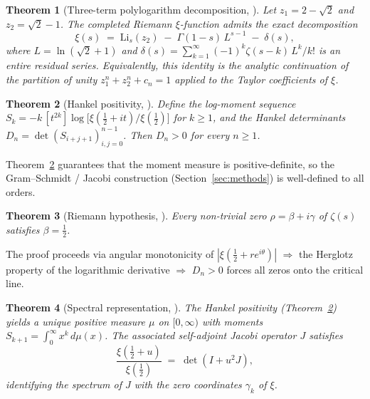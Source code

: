 \documentclass[aps,prx,reprint,floatfix]{revtex4-2}
\newtheorem{theorem}{Theorem}
\begin{document}
\begin{theorem}[Three-term polylogarithm decomposition, \cite{chen2026rh}]
\label{th:three-term}
Let $z_1=2-\sqrt{2}$ and $z_2=\sqrt{2}-1$. The completed Riemann
$\xi$-function admits the exact decomposition
\begin{equation}
\xi(s) \;=\; \mathrm{Li}_s(z_2)
\;-\; \Gamma(1-s)\,L^{s-1}
\;-\; \delta(s),
\label{eq:three-term-xi}
\end{equation}
where $L=\ln(\sqrt{2}+1)$ and $\delta(s)=\sum_{k=1}^{\infty}(-1)^k\zeta(s-k)\,L^k/k!$
is an entire residual series. Equivalently, this identity is the analytic
continuation of the partition of unity $z_1^n+z_2^n+c_n=1$ applied to the
Taylor coefficients of $\xi$.
\end{theorem}

\begin{theorem}[Hankel positivity, \cite{chen2026rh}]
\label{th:hankel}
Define the log-moment sequence
$S_k = -k\,[t^{2k}]\log\bigl[\xi(\tfrac{1}{2}+it)/\xi(\tfrac{1}{2})\bigr]$
for $k\ge1$, and the Hankel determinants
$D_n = \det(S_{i+j+1})_{i,j=0}^{n-1}$.
Then $D_n > 0$ for every $n\ge1$.
\end{theorem}

\noindent Theorem~\ref{th:hankel} guarantees that the moment measure is
positive-definite, so the Gram--Schmidt / Jacobi construction
(Section~\ref{sec:methods}) is well-defined to all orders.

\begin{theorem}[Riemann hypothesis, \cite{chen2026rh}]
\label{th:rh}
Every non-trivial zero $\rho=\beta+i\gamma$ of $\zeta(s)$ satisfies
$\beta=\tfrac{1}{2}$.
\end{theorem}

\noindent The proof proceeds via angular monotonicity of
$|\xi(\tfrac{1}{2}+re^{i\theta})|$
$\Rightarrow$ the Herglotz property of the logarithmic derivative
$\Rightarrow$ $D_n>0$ forces all zeros onto the critical line.

\begin{theorem}[Spectral representation, \cite{chen2026rh}]
\label{th:spectral}
The Hankel positivity (Theorem~\ref{th:hankel}) yields a unique positive
measure $\mu$ on $[0,\infty)$ with moments $S_{k+1}=\int_0^\infty x^k\,d\mu(x)$.
The associated self-adjoint Jacobi operator $J$ satisfies
\begin{equation}
\frac{\xi(\tfrac{1}{2}+u)}{\xi(\tfrac{1}{2})}
\;=\; \det(I + u^2 J),
\label{eq:spectral-det}
\end{equation}
identifying the spectrum of $J$ with the zero coordinates
$\gamma_k$ of $\xi$.
\end{theorem}
\end{document}
